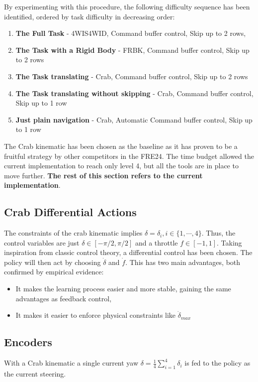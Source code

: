 \documentclass[11pt,a4paper,twocolumn]{article}
\begin{document}
By experimenting with this procedure, the following difficulty sequence has been identified, ordered by task difficulty in decreasing order:
\begin{enumerate}
    \item \textbf{The Full Task} - 4WIS4WID, Command buffer control, Skip up to 2 rows,
    \item \textbf{The Task with a Rigid Body} - FRBK, Command buffer control, Skip up to 2 rows
    \item \textbf{The Task translating} - Crab, Command buffer control, Skip up to 2 rows
    \item \textbf{The Task translating without skipping} - Crab, Command buffer control, Skip up to 1 row
    \item \textbf{Just plain navigation} - Crab, Automatic Command buffer control, Skip up to 1 row
\end{enumerate}
The Crab kinematic has been chosen as the baseline as it has proven to be a fruitful strategy by other competitors in the FRE24. The time budget allowed the current implementation to reach only level 4, but all the tools are in place to move further. \textbf{The rest of this section refers to the current implementation}.

\subsection{Crab Differential Actions}
The constraints of the crab kinematic implies $\delta = \delta_i, i\in\{1, \cdots, 4\}$. Thus, the control variables are just $\delta \in [-\pi/2, \pi/2]$ and a throttle $f \in [-1,1]$. Taking inspiration from classic control theory, a differential control has been chosen. The policy will then act by choosing $\dot{\delta}$ and $\dot{f}$. This has two main advantages, both confirmed by empirical evidence:
\begin{itemize}
    \item It makes the learning process easier and more stable, gaining the same advantages as feedback control,
    \item It makes it easier to enforce physical constraints like $\dot{\delta}_{max}$ 
\end{itemize}

\subsection{Encoders}
With a Crab kinematic a single current yaw $\delta = \frac{1}{4}\sum_{i=1}^{4}\delta_i$ is fed to the policy as the current steering. 
\end{document}
